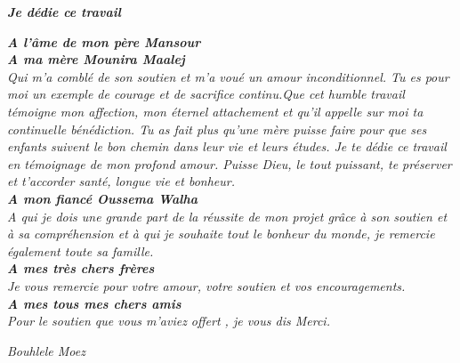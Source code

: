 \begin{center}
\textit{\textsl{ \textbf{Je dédie ce travail} } }
\end{center}
\begin{center}
\textsl{
 \textbf{A l'âme de mon père Mansour}
 \\[0.2in]
 \textbf{A ma mère Mounira Maalej}\\
 Qui m'a comblé de son soutien et m'a
voué un amour inconditionnel. Tu es pour moi un exemple de
courage et de sacrifice continu.Que cet humble travail témoigne
mon affection, mon éternel attachement et qu'il appelle sur moi
ta continuelle bénédiction. Tu as fait plus qu’une mère puisse faire pour que ses
enfants suivent le bon chemin dans leur vie et leurs études.
Je te dédie ce travail en témoignage de mon profond
amour. Puisse Dieu, le tout puissant, te préserver et
t’accorder santé, longue vie et bonheur.
\\[0.2in]
\textbf{A mon fiancé Oussema Walha}\\
A qui je dois une grande part de la réussite de mon projet grâce à
son soutien et à sa compréhension et à qui je souhaite tout le bonheur du monde,
je remercie également toute sa famille.
\\[0.2in]
\textbf{A mes très chers frères}\\
Je vous remercie pour votre amour,
votre soutien et vos encouragements.
\\[0.2in]
\textbf{A mes tous mes chers amis}\\
Pour le soutien que vous m'aviez
offert , je vous dis Merci.}
\begin{flushright}
 \textit{\emph {Bouhlele Moez}}
\end{flushright}

\end{center}
